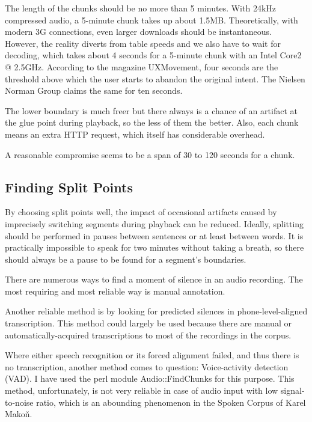 \documentclass[runningheads]{llncs}
\begin{document}
The length of the chunks should be no more than 5 minutes. With 24kHz
compressed audio, a 5-minute chunk takes up about 1.5MB. Theoretically, with
modern 3G connections, even larger downloads should be instantaneous. However,
the reality diverts from table speeds and we also have to wait for decoding,
which takes about 4 seconds for a 5-minute chunk with an Intel Core2 @ 2.5GHz.
According to the magazine UXMovement\cite{foursecondrule}, four seconds are the
threshold above which the user starts to abandon the original intent. The Nielsen
Norman Group\cite{websiteresponsetimes} claims the same for ten seconds.

The lower boundary is much freer but there always is a chance of an artifact at
the glue point during playback, so the less of them the better. Also, each chunk
means an extra HTTP request, which itself has considerable overhead.

A reasonable compromise seems to be a span of 30 to 120 seconds for a chunk.

\subsection{Finding Split Points}

By choosing split points well, the impact of occasional artifacts caused by
imprecisely switching segments during playback can be reduced. Ideally,
splitting should be performed in pauses between sentences or at least between
words. It is practically impossible to speak for two minutes without taking a
breath, so there should always be a pause to be found for a segment's
boundaries.

There are numerous ways to find a moment of silence in an audio recording. The
most requiring and most reliable way is manual annotation.

Another reliable method is by looking for predicted silences in
phone-level-aligned transcription. This method could largely be used because there are
manual or automatically-acquired transcriptions to most of the recordings in the
corpus.

Where either speech recognition or its forced alignment failed, and thus there
is no transcription, another method comes to question: Voice-activity detection
(VAD).  I have used the perl module Audio::FindChunks for this purpose. This
method, unfortunately, is not very reliable in case of audio input with low
signal-to-noise ratio, which is an abounding phenomenon in the Spoken Corpus of
Karel Makoň.
\end{document}
